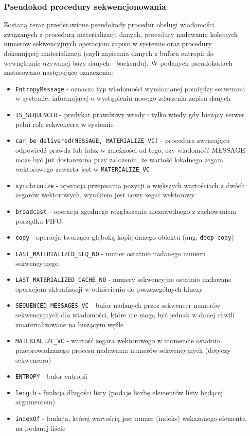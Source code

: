 \subsubsection*{Pseudokod procedury sekwencjonowania}

Zostaną teraz przedstawione pseudokody procedur obsługi wiadomości związanych z procedurą materializacji danych, procedury nadawania kolejnych numerów sekwencyjnych operacjom zapisu w systemie oraz procedury dokonującej materializacji (czyli zapisania danych z bufora entropii do wewnętrznie używanej bazy danych - backendu). W podanych pseudokodach zastosowano następujące oznaczenia:
\begin{itemize}
    \item \texttt{EntropyMessage} - oznacza typ wiadomości wymianianej pomiędzy serwerami w systemie, informującej o wystąpieniu nowego zdarzenia zapisu danych
    \item \texttt{IS\_SEQUENCER} - predykat prawdziwy wtedy i tylko wtedy gdy bieżący serwer pełni rolę sekwencera w systemie
    \item \texttt{can\_be\_delivered(MESSAGE, MATERIALIZE\_VC)} - procedura zwracająca odpowiedź prawda lub fałsz w zależności od tego, czy wiadomość MESSAGE może być już dostarczona przy założeniu, że wartość lokalnego zegara wektorowego zawarta jest w \texttt{MATERIALIZE\_VC}
    \item \texttt{synchronize} - operacja przepisania pozycji o większych wartościach z dwóch zegarów wektorowych, wynikiem jest nowy zegar wektorowy
    \item \texttt{broadcast} - operacja zgodnego rozgłaszania niezawodnego z zachowaniem porządku FIFO
    \item \texttt{copy} - operacja tworząca głęboką kopię danego obiektu (ang. \texttt{deep copy})
    \item \texttt{LAST\_MATERIALIZED\_SEQ\_NO} - numer ostatnio nadanego numeru sekwencyjnego
    \item \texttt{LAST\_MATERIALIZED\_CACHE\_NO} - numery sekwencyjne ostatnio nadawane operacjom aktualizacji w odniesieniu do poszczególnych kluczy
    \item \texttt{SEQUENCED\_MESSAGES\_VC} - bufor nadanych przez sekwencer numerów sekwencyjnych dla wiadomości, które nie mogą być jednak w danej chwili zmaterializowane na bieżącym węźle
    \item \texttt{MATERIALIZE\_VC} - wartość zegara wektorowego w momencie ostatnio przeprowadzanego procesu nadawania numerów sekwencyjnych (dotyczy sekwencera)
    \item \texttt{ENTROPY} - bufor entropii
    \item \texttt{length} - funkcja długości listy (podaje liczbę elementów listy będącej argumentem)
    \item \texttt{indexOf} - funkcja, której wartością jest numer (indeks) wskazanego elementu na podanej liście
\end{itemize}

